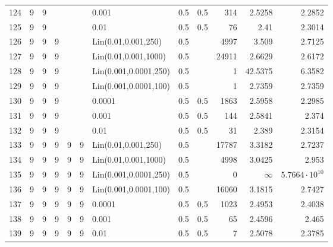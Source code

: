 \begin{longtable}{lrrrrrlrrrrr}
 124 &       9 & 9 &   &   &   &                 0.001 &  0.5 &    0.5 &     314 &                 2.5258 &                2.2852 \\
 125 &       9 & 9 &   &   &   &                  0.01 &  0.5 &    0.5 &      76 &                   2.41 &                2.3014 \\
 126 &       9 & 9 & 9 &   &   &   Lin(0.01,0.001,250) &  0.5 &        &    4997 &                  3.509 &                2.7125 \\
 127 &       9 & 9 & 9 &   &   &  Lin(0.01,0.001,1000) &  0.5 &        &   24911 &                 2.6629 &                2.6172 \\
 128 &       9 & 9 & 9 &   &   & Lin(0.001,0.0001,250) &  0.5 &        &       1 &                42.5375 &                6.3582 \\
 129 &       9 & 9 & 9 &   &   & Lin(0.001,0.0001,100) &  0.5 &        &       1 &                 2.7359 &                2.7359 \\
 130 &       9 & 9 & 9 &   &   &                0.0001 &  0.5 &    0.5 &    1863 &                 2.5958 &                2.2985 \\
 131 &       9 & 9 & 9 &   &   &                 0.001 &  0.5 &    0.5 &     144 &                 2.5841 &                 2.374 \\
 132 &       9 & 9 & 9 &   &   &                  0.01 &  0.5 &    0.5 &      31 &                  2.389 &                2.3154 \\
 133 &       9 & 9 & 9 & 9 & 9 &   Lin(0.01,0.001,250) &  0.5 &        &   17787 &                 3.3182 &                2.7237 \\
 134 &       9 & 9 & 9 & 9 & 9 &  Lin(0.01,0.001,1000) &  0.5 &        &    4998 &                 3.0425 &                 2.953 \\
 135 &       9 & 9 & 9 & 9 & 9 & Lin(0.001,0.0001,250) &  0.5 &        &       0 &               $\infty$ & $5.7664\cdot 10^{10}$ \\
 136 &       9 & 9 & 9 & 9 & 9 & Lin(0.001,0.0001,100) &  0.5 &        &   16060 &                 3.1815 &                2.7427 \\
 137 &       9 & 9 & 9 & 9 & 9 &                0.0001 &  0.5 &    0.5 &    1023 &                 2.4953 &                2.4038 \\
 138 &       9 & 9 & 9 & 9 & 9 &                 0.001 &  0.5 &    0.5 &      65 &                 2.4596 &                 2.465 \\
 139 &       9 & 9 & 9 & 9 & 9 &                  0.01 &  0.5 &    0.5 &       7 &                 2.5078 &                2.3785 \\
\end{longtable}
